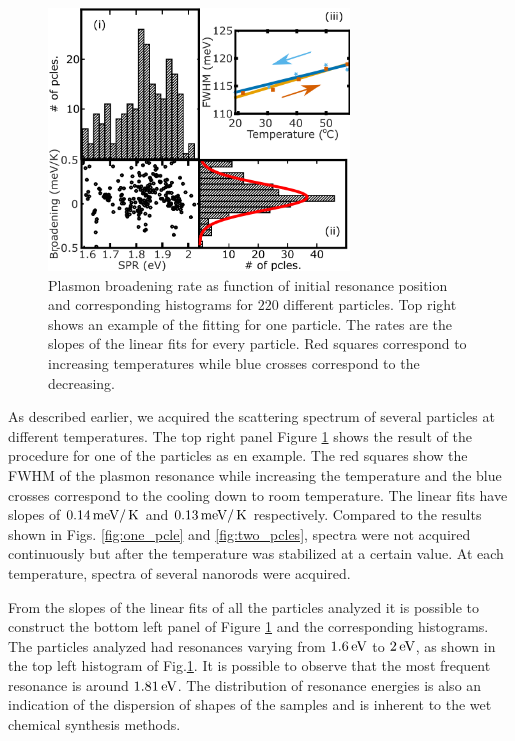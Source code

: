 \begin{figure}[tp]
\centering
\includegraphics[width=8cm]{Chapters/05_WhiteLight/Figures/04_Many_Pcles/04_Many_Particles.png}
\caption{Plasmon broadening rate as function of initial resonance position
and corresponding histograms for $220$ different particles. Top right shows an
example of the fitting for one particle. The rates are the slopes of the
linear fits for every particle. Red squares correspond to increasing
temperatures while blue crosses correspond to the decreasing.}
		\label{fig:many-pcles}
\end{figure}

As described earlier, we acquired the scattering spectrum of several particles
at different temperatures. The top right panel Figure \ref{fig:many-pcles} shows
the result of the procedure for one of the particles as en example. The red
squares show the FWHM of the plasmon resonance while increasing the
temperature and the blue crosses correspond to the cooling down to room
temperature. The linear fits have slopes of $0.14\,\textrm{meV}/\,\textrm{K}$ and $0.13\,\textrm{meV}/\,\textrm{K}$
respectively. Compared to the results shown in Figs. \ref{fig:one_pcle} and
\ref{fig:two_pcles}, spectra were not acquired continuously but after the
temperature was stabilized at a certain value. At each temperature, spectra
of several nanorods were acquired.

From the slopes of the linear fits of all the particles analyzed it is possible
to construct the bottom left panel of Figure \ref{fig:many-pcles} and the
corresponding histograms. The particles analyzed had resonances varying from
$1.6\,\textrm{eV}$ to $2\,\textrm{eV}$, as shown in the top left histogram of
Fig.\ref{fig:many-pcles}. It is possible to observe that the most frequent
resonance is around $1.81\,\textrm{eV}$. The distribution of resonance energies is also an
indication of the dispersion of shapes of the samples and is inherent to the wet
chemical synthesis methods.

